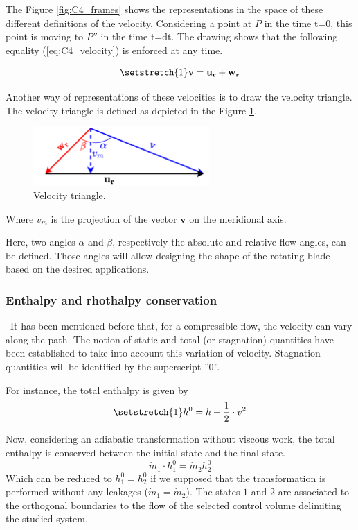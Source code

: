 The Figure \ref{fig:C4_frames} shows the representations in the space of these different definitions of the velocity. Considering a point at $P$ in the time t=0, this point is moving to \(P''\) in the time t=dt.  
The drawing shows that the following equality (\ref{eq:C4_velocity}) is enforced at any time.

\begin{equation}
    \setstretch{1}
    \mathbf{v} = \mathbf{u_r} + \mathbf{w_r} \label{eq:C4_velocity}
\end{equation}

Another way of representations of these velocities is to draw the velocity triangle. The velocity triangle is defined as depicted in the Figure \ref{fig:C4_vtriang}.

\begin{figure}[h]
    \centering
    \includegraphics[width=0.6\textwidth]{Vtriangle.png}
    \caption{Velocity triangle.}
    \label{fig:C4_vtriang}
\end{figure}
Where $v_m$ is the projection of the vector $\mathbf{v}$ on the meridional axis.

Here, two angles $\alpha$ and $\beta$, respectively the absolute and relative flow angles, can be defined. Those angles will allow designing the shape of the rotating blade based on the desired applications. 

\subsubsection{Enthalpy and rhothalpy conservation}
\quad\ It has been mentioned before that, for a compressible flow, the velocity can vary along the path. The notion of static and total (or stagnation) quantities have been established to take into account this variation of velocity. Stagnation quantities will be identified by the superscript ''0''.

For instance, the total enthalpy is given by
\begin{equation}
    \setstretch{1}
    h^0 = h + \frac{1}{2}\cdot v^2\label{eq:C4_h0}
\end{equation}

Now, considering an adiabatic transformation without viscous work, the total enthalpy is conserved between the initial state and the final state.
\begin{equation}
    \dot{m}_1\cdot h_1^0 = \dot{m}_2 h_2^0 \label{eq:C4_hcons}
\end{equation}
Which can be reduced to \(h_1^0 = h_2^0\) if we supposed that the transformation is performed without any leakages (\(\dot{m}_1=\dot{m}_2\)). The states \(1\) and \(2\) are associated to the orthogonal boundaries to the flow of the selected control volume delimiting the studied system.

